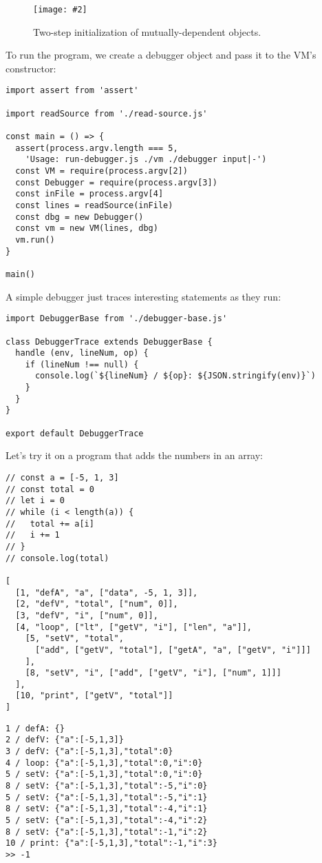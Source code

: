 \documentclass[krantzl]{krantz}
\newcommand{\figpdf}[4]{\begin{figure}%
\centering%
\texttt{[image: \#2]}%
\caption{#3}%
\label{#1}%
\end{figure}}
\begin{document}
\figpdf{debugger-initialization}{./debugger/initialization.pdf}{Two-step initialization of mutually-dependent objects.}{0.6}


To run the program,
we create a debugger object and pass it to the VM's constructor:


\begin{lstlisting}[frame=single,frameround=tttt]
import assert from 'assert'

import readSource from './read-source.js'

const main = () => {
  assert(process.argv.length === 5,
    'Usage: run-debugger.js ./vm ./debugger input|-')
  const VM = require(process.argv[2])
  const Debugger = require(process.argv[3])
  const inFile = process.argv[4]
  const lines = readSource(inFile)
  const dbg = new Debugger()
  const vm = new VM(lines, dbg)
  vm.run()
}

main()
\end{lstlisting}



A simple debugger just traces interesting statements as they run:


\begin{lstlisting}[frame=single,frameround=tttt]
import DebuggerBase from './debugger-base.js'

class DebuggerTrace extends DebuggerBase {
  handle (env, lineNum, op) {
    if (lineNum !== null) {
      console.log(`${lineNum} / ${op}: ${JSON.stringify(env)}`)
    }
  }
}

export default DebuggerTrace
\end{lstlisting}



Let's try it on a program that adds the numbers in an array:


\begin{lstlisting}[frame=single,frameround=tttt]
// const a = [-5, 1, 3]
// const total = 0
// let i = 0
// while (i < length(a)) {
//   total += a[i]
//   i += 1
// }
// console.log(total)

[
  [1, "defA", "a", ["data", -5, 1, 3]],
  [2, "defV", "total", ["num", 0]],
  [3, "defV", "i", ["num", 0]],
  [4, "loop", ["lt", ["getV", "i"], ["len", "a"]],
    [5, "setV", "total",
      ["add", ["getV", "total"], ["getA", "a", ["getV", "i"]]]
    ],
    [8, "setV", "i", ["add", ["getV", "i"], ["num", 1]]]
  ],
  [10, "print", ["getV", "total"]]
]
\end{lstlisting}



\begin{lstlisting}[frame=single,frameround=tttt]
1 / defA: {}
2 / defV: {"a":[-5,1,3]}
3 / defV: {"a":[-5,1,3],"total":0}
4 / loop: {"a":[-5,1,3],"total":0,"i":0}
5 / setV: {"a":[-5,1,3],"total":0,"i":0}
8 / setV: {"a":[-5,1,3],"total":-5,"i":0}
5 / setV: {"a":[-5,1,3],"total":-5,"i":1}
8 / setV: {"a":[-5,1,3],"total":-4,"i":1}
5 / setV: {"a":[-5,1,3],"total":-4,"i":2}
8 / setV: {"a":[-5,1,3],"total":-1,"i":2}
10 / print: {"a":[-5,1,3],"total":-1,"i":3}
>> -1
\end{lstlisting}
\end{document}
